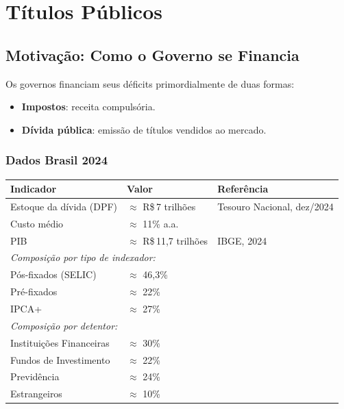 
\chapter{Títulos Públicos}

\section{Motivação: Como o Governo se Financia}

Os governos financiam seus déficits primordialmente de duas formas:
\begin{itemize}
  \item \textbf{Impostos}: receita compulsória.
  \item \textbf{Dívida pública}: emissão de títulos vendidos ao mercado.
\end{itemize}

\subsection*{Dados Brasil 2024}

\begin{center}
\renewcommand{\arraystretch}{1.3}
\begin{tabular}{lll}
\toprule
\textbf{Indicador} & \textbf{Valor} & \textbf{Referência} \\
\midrule
Estoque da dívida (DPF) & $\approx$ R\$\,7 trilhões & Tesouro Nacional, dez/2024 \\
Custo médio             & $\approx$ 11\% a.a.        & \\
PIB                     & $\approx$ R\$\,11,7 trilhões & IBGE, 2024 \\
\midrule
\multicolumn{3}{l}{\textit{Composição por tipo de indexador:}} \\
Pós-fixados (SELIC)     & $\approx$ 46,3\%           & \\
Pré-fixados             & $\approx$ 22\%             & \\
IPCA+                   & $\approx$ 27\%             & \\
\midrule
\multicolumn{3}{l}{\textit{Composição por detentor:}} \\
Instituições Financeiras & $\approx$ 30\%            & \\
Fundos de Investimento   & $\approx$ 22\%            & \\
Previdência              & $\approx$ 24\%            & \\
Estrangeiros             & $\approx$ 10\%            & \\
\bottomrule
\end{tabular}
\end{center}

